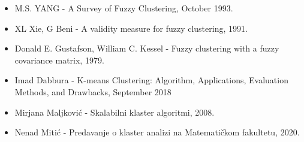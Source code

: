 \documentclass{article}
\begin{document}
\selectfont
\begin{itemize}
\item M.S. YANG - A Survey of Fuzzy Clustering, October 1993.
\item XL Xie, G Beni - A validity measure for fuzzy clustering, 1991.
\item Donald E. Gustafson, William C. Kessel - Fuzzy clustering with a fuzzy covariance matrix, 1979.
\item Imad Dabbura - K-means Clustering: Algorithm, Applications, Evaluation Methods, and Drawbacks, September 2018
\selectfont
\item Mirjana Maljkovi\'{c} - Skalabilni klaster algoritmi, 2008.
\item Nenad Miti\'{c} - Predavanje o klaster analizi na Matemati\v{c}kom fakultetu, 2020.
\end{itemize}
\end{document}
